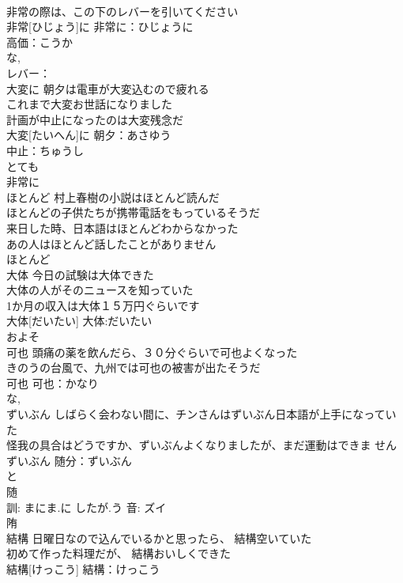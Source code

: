 \documentclass[8pt]{extreport}
\begin{document}
\begin{CJK}{UTF8}{min}
\\	非常の際は、この下のレバーを引いてください 
\\	非常[ひじょう]に			非常に：ひじょうに
\\	高価：こうか
\\	な, 
\\	レバー：
\\	大変に	朝夕は電車が大変込むので疲れる 
\\	これまで大変お世話になりました 
\\	計画が中止になったのは大変残念だ 
\\	大変[たいへん]に			朝夕：あさゆう
\\	中止：ちゅうし
\\	とても 
\\	非常に 
\\	ほとんど	村上春樹の小説はほとんど読んだ 
\\	ほとんどの子供たちが携帯電話をもっているそうだ 
\\	来日した時、日本語はほとんどわからなかった 
\\	あの人はほとんど話したことがありません 
\\	ほとんど						
\\	大体	今日の試験は大体できた 
\\	大体の人がそのニュースを知っていた 
\\	1か月の収入は大体１５万円ぐらいです 
\\	大体[だいたい]			大体:だいたい
\\	およそ 
\\	可也	頭痛の薬を飲んだら、３０分ぐらいで可也よくなった 
\\	きのうの台風で、九州では可也の被害が出たそうだ 
\\	可也			可也：かなり
\\	な, 
\\	ずいぶん	しばらく会わない間に、チンさんはずいぶん日本語が上手になっていた 
\\	怪我の具合はどうですか、ずいぶんよくなりましたが、まだ運動はできま せん 
\\	ずいぶん			随分：ずいぶん
\\	と 
\\	随 
\\	訓: まにま.に したが.う 音: ズイ 
\\	陏	
\\	結構	日曜日なので込んでいるかと思ったら、 結構空いていた 
\\	初めて作った料理だが、 結構おいしくできた 
\\	結構[けっこう]			結構：けっこう

\end{CJK}
\end{document}
